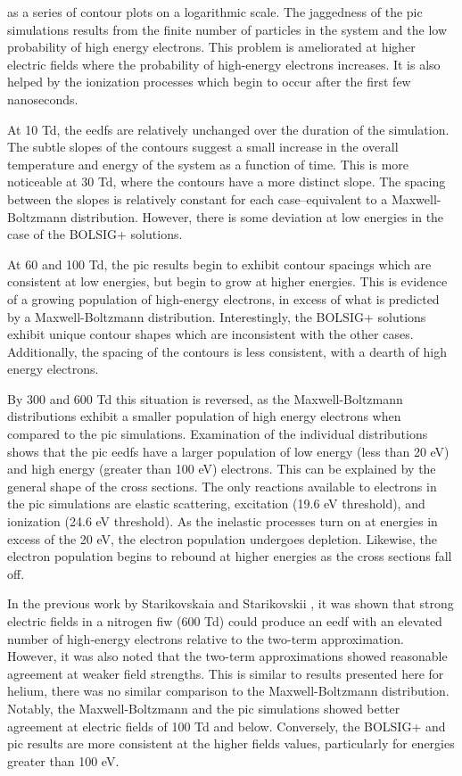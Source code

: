 as a series of contour plots on a logarithmic scale. The jaggedness of the
\acs{pic} simulations results from the finite number of particles in the system
and the low probability of high energy electrons. This problem is ameliorated at
higher electric fields where the probability of high-energy electrons increases.
It is also helped by the ionization processes which begin to occur after the
first few nanoseconds.

At 10 Td, the \acs{eedf}s are relatively unchanged over the duration of the
simulation. The subtle slopes of the contours suggest a small increase in the
overall temperature and energy of the system as a function of time. This is more
noticeable at 30 Td, where the contours have a more distinct slope. The spacing
between the slopes is relatively constant for each case--equivalent to a
Maxwell-Boltzmann distribution. However, there is some deviation at low energies
in the case of the BOLSIG+ solutions.

At 60 and 100 Td, the \acs{pic} results begin to exhibit contour spacings which
are consistent at low energies, but begin to grow at higher energies. This is
evidence of a growing population of high-energy electrons, in excess of what is
predicted by a Maxwell-Boltzmann distribution. Interestingly, the BOLSIG+
solutions exhibit unique contour shapes which are inconsistent with the other
cases. Additionally, the spacing of the contours is less consistent, with a
dearth of high energy electrons. 

By 300 and 600 Td this situation is reversed, as the Maxwell-Boltzmann
distributions exhibit a smaller population of high energy electrons when
compared to the \acs{pic} simulations. Examination of the individual
distributions shows that the \acs{pic} \acs{eedf}s have a larger population of
low energy (less than 20 eV) and high energy (greater than 100 eV) electrons.
This can be explained by the general shape of the cross sections. The only
reactions available to electrons in the \acs{pic} simulations are elastic
scattering, excitation (19.6 eV threshold), and ionization (24.6 eV threshold).
As the inelastic processes turn on at energies in excess of the 20 eV, the
electron population undergoes depletion. Likewise, the electron population
begins to rebound at higher energies as the cross sections fall off.

In the previous work by Starikovskaia and Starikovskii \cite{Starikovskaia2001a},
it was shown that strong electric fields in a nitrogen \acs{fiw} (600 Td) could
produce an \acs{eedf} with an elevated number of high-energy electrons relative
to the two-term approximation. However, it was also noted that the two-term
approximations showed reasonable agreement at weaker field strengths. This is
similar to results presented here for helium, there was no similar comparison to
the Maxwell-Boltzmann distribution. Notably, the Maxwell-Boltzmann and the
\acs{pic} simulations showed better agreement at electric fields of 100 Td
and below. Conversely, the BOLSIG+ and \acs{pic} results are more consistent at
the higher fields values, particularly for energies greater than 100 eV.

